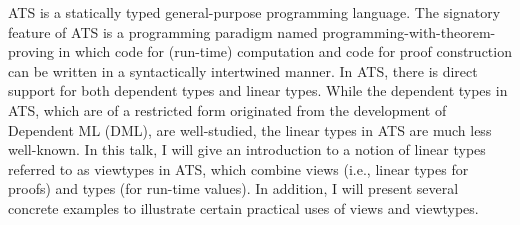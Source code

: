%
%
%
%
%
ATS is a statically typed general-purpose programming language.  The
signatory feature of ATS is a programming paradigm named
programming-with-theorem-proving in which code for (run-time) computation
and code for proof construction can be written in a syntactically
intertwined manner.  In ATS, there is direct support for both dependent
types and linear types. While the dependent types in ATS, which are of a
restricted form originated from the development of Dependent ML (DML), are
well-studied, the linear types in ATS are much less well-known.  In this
talk, I will give an introduction to a notion of linear types referred to
as viewtypes in ATS, which combine views (i.e., linear types for proofs)
and types (for run-time values). In addition, I will present several
concrete examples to illustrate certain practical uses of views and
viewtypes.
%
%
%
%
%


